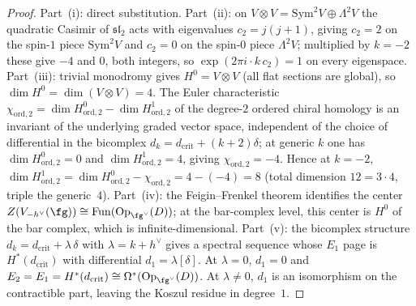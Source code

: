 \begin{proof}
Part~(i): direct substitution.
Part~(ii): on $V\otimes V = \mathrm{Sym}^2 V \oplus \Lambda^2 V$
the quadratic Casimir of $\mathfrak{sl}_2$ acts with eigenvalues
$c_2 = j(j+1)$, giving $c_2 = 2$ on the spin-$1$ piece
$\mathrm{Sym}^2 V$ and $c_2 = 0$ on the spin-$0$ piece
$\Lambda^2 V$; multiplied by $k = -2$ these give $-4$ and $0$,
both integers, so $\exp(2\pi i \cdot k\, c_2) = 1$ on every
eigenspace.
Part~(iii): trivial monodromy gives $H^0 = V \otimes V$
(all flat sections are global), so $\dim H^0 = \dim(V \otimes V) = 4$.
The Euler characteristic
$\chi_{\mathrm{ord}, 2} = \dim H^0_{\mathrm{ord}, 2} - \dim H^1_{\mathrm{ord}, 2}$
of the degree-$2$ ordered chiral homology is an invariant of the
underlying graded vector space, independent of the choice of
differential in the bicomplex $d_k = d_{\mathrm{crit}} + (k + 2)\delta$;
at generic $k$ one has $\dim H^0_{\mathrm{ord},2} = 0$ and
$\dim H^1_{\mathrm{ord},2} = 4$, giving $\chi_{\mathrm{ord}, 2} = -4$. Hence
at $k = -2$, $\dim H^1_{\mathrm{ord}, 2} = \dim H^0_{\mathrm{ord}, 2} -
\chi_{\mathrm{ord}, 2} = 4 - (-4) = 8$ (total dimension $12 = 3 \cdot 4$,
triple the generic~$4$).
Part~(iv): the Feigin--Frenkel theorem identifies the center
$Z(V_{-h^\vee}(\fg)) \cong
\operatorname{Fun}(\operatorname{Op}_{\fg^\vee}(D))$;
at the bar-complex level, this center is $H^0$ of the
bar complex, which is infinite-dimensional.
Part~(v): the bicomplex structure
$d_k = d_{\mathrm{crit}} + \lambda\,\delta$ with
$\lambda = k + h^\vee$ gives a spectral sequence whose
$E_1$ page is $H^*(d_{\mathrm{crit}})$ with differential
$d_1 = \lambda[\delta]$. At $\lambda = 0$, $d_1 = 0$ and
$E_2 = E_1 = H^*(d_{\mathrm{crit}})
\cong \Omega^*(\operatorname{Op}_{\fg^\vee}(D))$.
At $\lambda \neq 0$, $d_1$ is an isomorphism on the
contractible part, leaving the Koszul residue in degree~$1$.
\end{proof}

